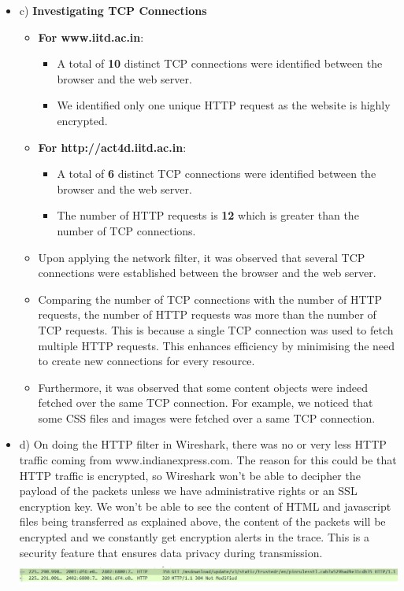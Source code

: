 \documentclass{article}
\begin{document}
\begin{itemize}
    \item c) \textbf{Investigating TCP Connections} 
     \begin{itemize}
         \item \textbf{For www.iitd.ac.in}:
            \begin{itemize}
            \item A total of \textbf{10} distinct TCP connections were identified between the browser and the web server.
            \item We identified only one unique HTTP request as the website is highly encrypted.
        \end{itemize}
        \item \textbf{For http://act4d.iitd.ac.in}:
        \begin{itemize}
            \item A total of \textbf{6} distinct TCP connections were identified between the browser and the web server.
            \item The number of HTTP requests is \textbf{12} which is greater than the number of TCP connections. 
        \end{itemize}
        \item Upon applying the network filter, it was observed that several TCP connections were established between the browser and the web server.
        \item Comparing the number of TCP connections with the number of HTTP requests, the number of HTTP requests was more than the number of TCP requests. This is because a single TCP connection was used to fetch multiple HTTP requests. This enhances efficiency by minimising the need to create new connections for every resource.
        \item Furthermore, it was observed that some content objects were indeed fetched over the same TCP connection. For example, we noticed that some CSS files and images were fetched over a same TCP connection.
     \end{itemize}
    \item d) On doing the HTTP filter in Wireshark, there was no or very less HTTP traffic coming from www.indianexpress.com. The reason for this could be that HTTP traffic is encrypted, so Wireshark won't be able to decipher the payload of the packets unless we have administrative rights or an SSL encryption key. We won't be able to see the content of HTML and javascript files being transferred as explained above, the content of the packets will be encrypted and we constantly get encryption alerts in the trace. This is a security feature that ensures data privacy during transmission. \\
    \includegraphics[width=15cm, height=1cm]{http-for-indian-express.jpeg}
\end{itemize}
\end{document}
